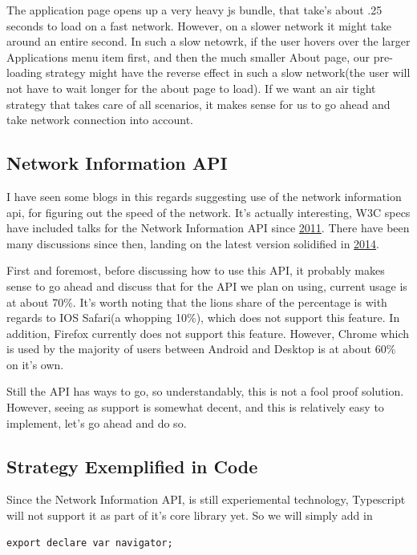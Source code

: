 The application page opens up a very heavy js bundle, that take's about 
.25 seconds to load on a fast network. However, on a slower network it might 
take around an entire second. In such a slow netowrk, if the user hovers
over the larger Applications menu item first, and then the much smaller About page,
our pre-loading strategy might have the reverse effect in such a slow network(the user 
will not have to wait longer for the about page to load). If we want an air tight
strategy that takes care of all scenarios, it makes sense for us to go ahead and
take network connection into account. 

\subsection{Network Information API}
I have seen some blogs in this regards suggesting use of the network
information api, for figuring out the speed of the network. It's actually 
interesting, W3C specs have included talks for the Network Information API 
since \href{https://www.w3.org/TR/2011/WD-netinfo-api-20110607/}{2011}. There 
have been many discussions since then, landing on the latest version solidified
 in \href{https://www.w3.org/TR/netinfo-api/}{2014}. 

First and foremost, before discussing how to use this API, it probably makes 
sense to go ahead and discuss that for the API we plan on using, current usage 
is at about 70\%. It's worth noting that the lions share of the percentage is 
with regards to IOS Safari(a whopping 10\%), which does not support this feature. 
In addition, Firefox currently does not support this feature. However, Chrome
which is used  by the majority of users between Android and Desktop is at about 
60\% on it's own. 

Still the API has ways to go, so understandably, this is not a fool proof 
solution. However, seeing as support is somewhat decent, and this is relatively 
easy to implement, let's go ahead and do so. 

\subsection{ Strategy Exemplified in Code }

Since the Network Information API, is still experiemental technology, Typescript 
will not support it as part of it's core library yet. So we will simply add in 
\begin{lstlisting}
export declare var navigator;
\end{lstlisting}


